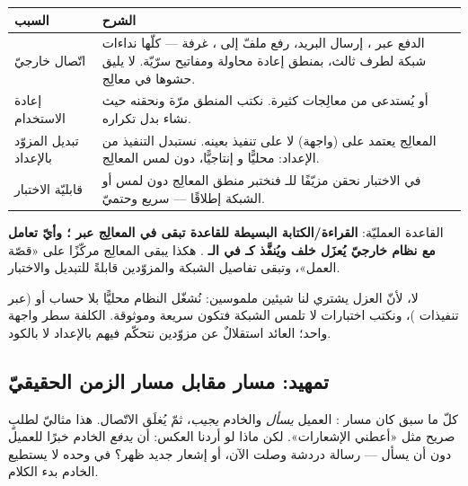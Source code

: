 \begin{center}
\begin{tabular}{L{4.2cm} L{8.6cm}}
\toprule
\textbf{\color{spPrimary}السبب} & \textbf{\color{spPrimary}الشرح} \\
\midrule
اتّصال  خارجيّ &
  الدفع عبر ، إرسال البريد، رفع ملفّ إلى ، غرفة  — كلّها
  نداءات شبكة لطرف ثالث، بمنطق إعادة محاولة ومفاتيح سرّيّة. لا يليق حشوها في معالِج. \\
إعادة الاستخدام &
   أو  يُستدعى من معالِجات كثيرة. نكتب المنطق
  مرّة ونحقنه حيث نشاء بدل تكراره. \\
تبديل المزوّد بالإعداد &
  المعالِج يعتمد على  (واجهة) لا على تنفيذ بعينه. نستبدل التنفيذ من الإعداد:
   محليًّا و إنتاجيًّا،
  دون لمس المعالِج. \\
قابليّة الاختبار &
  في الاختبار نحقن  مزيّفًا للـ  فنختبر منطق المعالِج دون لمس
   أو الشبكة إطلاقًا — سريع وحتميّ. \\
\bottomrule
\end{tabular}
\end{center}

القاعدة العمليّة: \textbf{القراءة/الكتابة البسيطة للقاعدة تبقى في المعالِج عبر
؛ وأيّ تعامل مع نظام خارجيّ يُعزَل خلف  ويُنفَّذ كـ 
في الـ }. هكذا يبقى المعالِج مركّزًا على «قصّة العمل»، وتبقى
تفاصيل الشبكة والمزوّدين قابلةً للتبديل والاختبار.

\begin{qa}
لا، لأنّ العزل يشتري لنا شيئين ملموسين: نُشغّل النظام محليًّا بلا حساب 
أو  (عبر تنفيذات )، ونكتب اختبارات لا تلمس الشبكة فتكون سريعة
وموثوقة. الكلفة سطر واجهة واحد؛ العائد استقلالٌ عن مزوّدين نتحكّم فيهم بالإعداد لا
بالكود.
\end{qa}

\subsection{تمهيد: مسار  مقابل مسار الزمن الحقيقيّ }

كلّ ما سبق كان مسار : العميل \emph{يسأل} والخادم \emph{يجيب}، ثمّ يُغلَق
الاتّصال. هذا مثاليّ لطلبٍ صريح مثل «أعطني الإشعارات». لكن ماذا لو أردنا العكس: أن
\emph{يدفع} الخادم خبرًا للعميل دون أن يسأل — رسالة دردشة وصلت الآن، أو إشعار جديد
ظهر؟ في  وحده لا يستطيع الخادم بدء الكلام.

